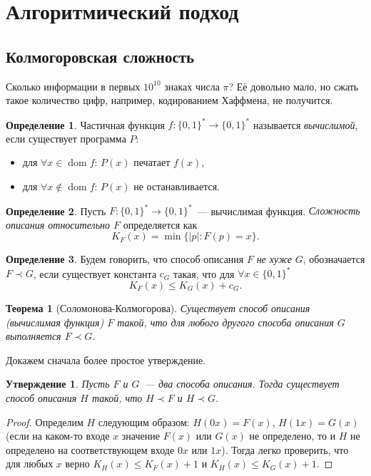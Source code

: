 \documentclass[12pt]{article}
\newcommand{\bits}{\{0,1\}}
\newcommand{\bitstr}{\bits^*}
\DeclareMathOperator{\dom}{dom}
\theoremstyle{definition}
\newtheorem{definition}{Определение}[section]
\theoremstyle{plain}
\newtheorem{theorem}{Теорема}[section]
\newtheorem{statement}{Утверждение}[section]
\theoremstyle{remark}
\begin{document}
\section{Алгоритмический подход}
\subsection{Колмогоровская сложность}
Сколько информации в первых $10^{10}$ знаках числа $\pi$? Её довольно мало,
но сжать такое количество цифр, например, кодированием Хаффмена, не
получится.

\begin{definition}
    Частичная функция $f:\bitstr\to\bitstr$ называется \emph{вычислимой}, если
    существует программа $P$:
    \begin{itemize}
        \item для $\forall x    \in\dom f$: $P(x)$ печатает $f(x)$,
        \item для $\forall x\not\in\dom f$: $P(x)$ не останавливается.
    \end{itemize}
\end{definition}
\begin{definition}
    Пусть $F:\bitstr\to\bitstr$~--- вычислимая функция. \emph{Сложность описания 
    относительно $F$} определяется как \[K_F(x) = \min\{|p| : F(p) = x\}.\]
\end{definition}
\begin{definition}
    Будем говорить, что способ описания $F$ \emph{не хуже} $G$, обозначается
    $F\prec G$, если существует константа $c_G$ такая, что для $\forall x\in\bitstr$ 
    \[K_F(x) \le K_G(x) + c_G.\]
\end{definition}
\begin{theorem}[Соломонова-Колмогорова]\label{thm:solomonov-kolmogorov}
    Существует способ описания (вычислимая функция) $F$ такой, что для любого
    другого способа описания $G$ выполняется $F\prec G$.  
\end{theorem}
Докажем сначала более простое утверждение.
\begin{statement}
    Пусть $F$ и $G$~— два способа описания. Тогда существует способ описания $H$ 
    такой, что $H\prec F$ и $H\prec G$.
\end{statement}
\begin{proof}
    Определим $H$ следующим образом: $H(0x) = F(x)$, $H(1x) = G(x)$ (если
    на каком-то входе $x$ значение $F(x)$ или $G(x)$ не определено, то и $H$ не определено на
    соответствующем входе $0x$ или $1x$). Тогда легко
    проверить, что для любых $x$ верно $K_H(x)\le K_F(x) + 1$ и $K_H(x)\le K_G(x) + 1$.
\end{proof}
\end{document}
